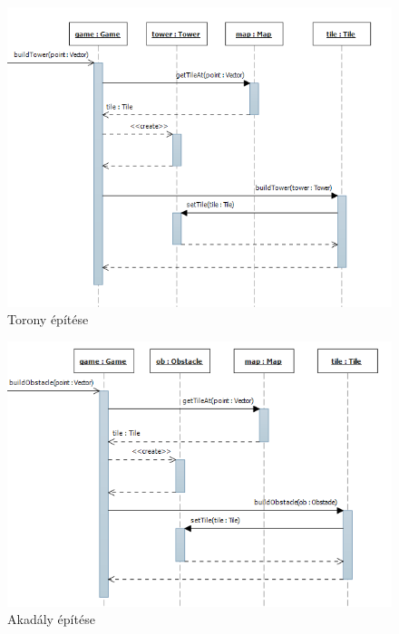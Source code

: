 \begin{figure}[!h]
\begin{center}
\includegraphics[width=15cm]{images/build_tower.png}
\caption{Torony építése}
\label{fig:build_tower}
\end{center}
\end{figure}

\begin{figure}[!h]
\begin{center}
\includegraphics[width=15cm]{images/build_obstacle.png}
\caption{Akadály építése}
\label{fig:build_tower}
\end{center}
\end{figure}

